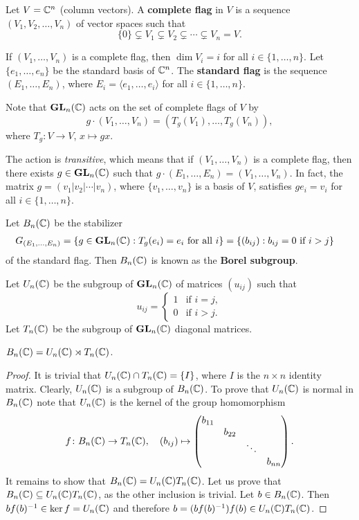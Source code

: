 \begin{definition}
    Let $V=\mathbb{C}^{n}$ (column vectors). A \textbf{complete flag} in $V$ 
    is a sequence $(V_1,V_2,\dots,V_n)$ of vector spaces
    such that 
    \[
    \{0\}\subsetneq V_1\subsetneq V_2\subsetneq\cdots\subsetneq V_n=V.
    \]
\end{definition}

If $(V_1,\dots,V_n)$ is a complete flag, then $\dim V_i=i$ for all 
$i\in\{1,\dots,n\}$. 
Let $\{e_1,\dots,e_n\}$ be the standard basis of $\mathbb{C}^n$. 
The \textbf{standard flag} is the sequence $(E_1,\dots,E_n)$, where
$E_i=\langle e_1,\dots,e_i\rangle$ for all $i\in\{1,\dots,n\}$.  

Note that $\mathbf{GL}_n(\mathbb{C})$ acts on the set of complete flags of $V$ 
by 
\[
g\cdot (V_1,\dots,V_n)=(T_g(V_1),\dots,T_g(V_n)),
\]
where $T_g\colon V\to V$, $x\mapsto gx$. 

The action is \emph{transitive}, 
which means that if $(V_1,\dots,V_n)$ 
is a complete flag, then there exists 
$g\in\mathbf{GL}_n(\mathbb{C})$ such that $g\cdot (E_1,\dots,E_n)=(V_1,\dots,V_n)$. 
In fact, 
the matrix $g=(v_1|v_2|\cdots|v_n)$, where
$\{v_1,\dots,v_n\}$ is a basis of $V$, 
satisfies $ge_i=v_i$ for all $i\in\{1,\dots,n\}$. 

\label{Borel subgroup}
Let $B_n(\mathbb{C})$ be the stabilizer    
\begin{align*}
G_{(E_1,\dots,E_n)}
&=\{g\in\mathbf{GL}_n(\mathbb{C}):T_g(e_i)=e_i\text{ for all $i$}\}
=\{(b_{ij}):b_{ij}=0\text{ if $i>j$}\}
\end{align*}
of the standard flag. Then $B_n(\mathbb{C})$ is 
known as the \textbf{Borel subgroup}. 

Let $U_n(\mathbb{C})$ be the subgroup of $\mathbf{GL}_n(\mathbb{C})$ 
of matrices $(u_{ij})$ such that 
\[
u_{ij}=\begin{cases}
1&\text{if $i=j$},\\
0&\text{if $i>j$}.\end{cases}
\]
Let $T_n(\mathbb{C})$ be the subgroup of $\mathbf{GL}_n(\mathbb{C})$ diagonal matrices. 

\begin{proposition}
    $B_n(\mathbb{C})=U_n(\mathbb{C})\rtimes T_n(\mathbb{C})$. 
\end{proposition}

\begin{proof}
    It is trivial that $U_n(\mathbb{C})\cap T_n(\mathbb{C})=\{I\}$, where $I$ is the 
    $n\times n$ identity matrix. Clearly, $U_n(\mathbb{C})$ is a subgroup of $B_n(\mathbb{C})$.
    To prove that 
    $U_n(\mathbb{C})$ is normal in $B_n(\mathbb{C})$ note that $U_n(\mathbb{C})$ is the kernel
    of the group homomorphism
    \[
    f\colon B_n(\mathbb{C})\to T_n(\mathbb{C}),\quad
    (b_{ij})\mapsto\begin{pmatrix}
        b_{11}\\
        &b_{22}\\
        &&\ddots\\
        &&&b_{nn}
    \end{pmatrix}.
    \]
    It remains to show that $B_n(\mathbb{C})=U_n(\mathbb{C})T_n(\mathbb{C})$.
    Let us prove that  $B_n(\mathbb{C})\subseteq U_n(\mathbb{C})T_n(\mathbb{C})$, as the other inclusion is trivial. 
    Let $b\in B_n(\mathbb{C})$. Then
    $bf(b)^{-1}\in \ker f=U_n(\mathbb{C})$ and therefore  
    $b=(bf(b)^{-1})f(b)\in U_n(\mathbb{C})T_n(\mathbb{C})$. 
\end{proof}

